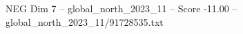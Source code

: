 \begin{textsample}{NEG Dim 7 – global\_north\_2023\_11 – Score -11.00 – global\_north\_2023\_11/91728535.txt}
\end{textsample}
